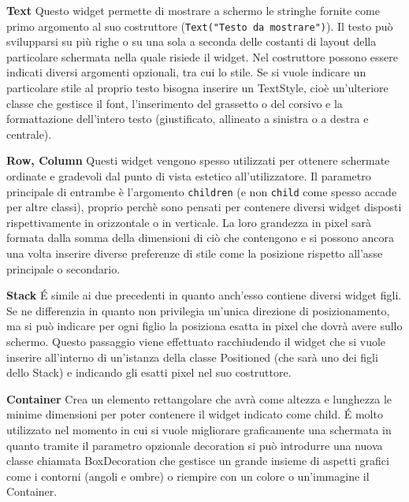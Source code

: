 	\begin{trivlist}
		\item \textbf{Text} \newline
		Questo widget permette di mostrare a schermo le stringhe fornite come
		primo argomento al suo costruttore (\verb|Text("Testo da mostrare")|).
		Il testo può svilupparsi su più righe o su una sola a seconda delle
		costanti di layout della particolare schermata nella quale risiede il
		widget. Nel costruttore possono essere indicati diversi argomenti
		opzionali, tra cui lo stile. Se si vuole indicare un particolare stile
		al proprio testo bisogna inserire un TextStyle, cioè un'ulteriore classe
		che gestisce il font, l'inserimento del grassetto o del corsivo e la
		formattazione dell'intero testo (giustificato, allineato a sinistra o a
		destra e centrale).  
		\item \textbf{Row, Column} \newline
		Questi widget vengono spesso utilizzati per ottenere schermate ordinate
		e gradevoli dal punto di vista estetico all'utilizzatore. Il parametro
		principale di entrambe è l'argomento \verb|children| (e non \verb|child| come
		spesso accade per altre classi), proprio perchè sono pensati per
		contenere diversi widget disposti rispettivamente in orizzontale o in
		verticale. La loro grandezza in pixel sarà formata dalla somma della
		dimensioni di ciò che contengono e si possono ancora una volta inserire diverse
		preferenze di stile come la posizione rispetto all'asse principale o
		secondario. 
		\item \textbf{Stack} \newline
		\'E simile ai due precedenti in quanto anch'esso contiene diversi widget
		figli. Se ne differenzia in quanto non privilegia un'unica direzione di
		posizionamento, ma si può indicare per ogni figlio la posiziona esatta
		in pixel che dovrà avere sullo schermo. Questo passaggio viene
		effettuato racchiudendo il widget che si vuole inserire all'interno di
		un'istanza della classe Positioned (che sarà uno dei figli dello Stack)
		e indicando gli esatti pixel nel suo costruttore. 
		\item \textbf{Container} \newline
		Crea un elemento rettangolare che avrà come altezza e lunghezza le
		minime dimensioni per poter contenere il widget indicato come child. \'E
		molto utilizzato nel momento in cui si vuole migliorare graficamente una
		schermata in quanto tramite il parametro opzionale decoration si può
		introdurre una nuova classe chiamata BoxDecoration che gestisce un
		grande insieme di aspetti grafici come i contorni (angoli e
		ombre) o riempire con un colore o un'immagine il Container.
	\end{trivlist}

